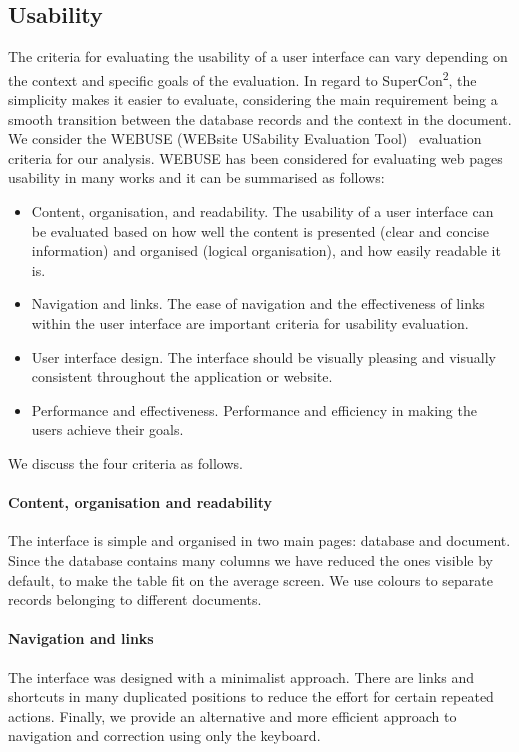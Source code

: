 \documentclass[a4paper]{article}
\begin{document}
\subsection{Usability}
The criteria for evaluating the usability of a user interface can vary depending on the context and specific goals of the evaluation. 
In regard to SuperCon\textsuperscript{2}, the simplicity makes it easier to evaluate, considering the main requirement being a smooth transition between the database records and the context in the document. 
We consider the WEBUSE (WEBsite USability Evaluation Tool)~\cite{chiew2003webuse} evaluation criteria for our analysis. WEBUSE has been considered for evaluating web pages usability in many works and it can be summarised as follows: 
\begin{itemize}
    \item Content, organisation, and readability. The usability of a user interface can be evaluated based on how well the content is presented (clear and concise information) and organised (logical organisation), and how easily readable it is. 
    \item Navigation and links. The ease of navigation and the effectiveness of links within the user interface are important criteria for usability evaluation. 
    \item User interface design. The interface should be visually pleasing and visually consistent throughout the application or website. 
    \item Performance and effectiveness. Performance and efficiency in making the users achieve their goals.
\end{itemize}

We discuss the four criteria as follows. 
\paragraph{Content, organisation and readability} The interface is simple and organised in two main pages: database and document. Since the database contains many columns we have reduced the ones visible by default, to make the table fit on the average screen. We use colours to separate records belonging to different documents. 

\paragraph{Navigation and links} The interface was designed with a minimalist approach. 
There are links and shortcuts in many duplicated positions to reduce the effort for certain repeated actions.
Finally, we provide an alternative and more efficient approach to navigation and correction using only the keyboard. 
\end{document}
